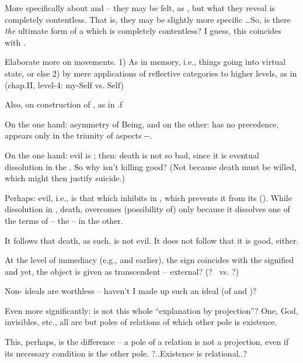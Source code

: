 \pa
More specifically about  and  -- they may 
be felt, as , but what they reveal is completely 
contentless. That is, they may be slightly more specific \ldots So, 
is there {\em the} ultimate form of a  which is completely 
contentless? I guess, this coincides with \sch. 

\pa
Elaborate more on  movements. 1) As in memory, i.e., 
things going into virtual state, or else 2) by mere applications of 
reflective categories to higher levels, as in 
 (chap.II, level-4: my-Self vs. Self)

Also, on construction of , as in .f


\pa
On the one hand: asymmetry of Being, and on the other:  has no precedence,
appears only in the triunity of aspects
--. 

On the one hand: evil is ; then: death is not so bad, since it is
eventual dissolution in the . So why isn't killing good? (Not
because death must be willed, which might then justify suicide.)

Perhaps: evil, i.e.,  is that which inhibits  in
, which prevents it from  its
 (). While dissolution in , death,
overcomes (possibility of)  only because it dissolves one of
the terms of  -- the  -- in the other.

It follows that death, as such, is not evil. It does not follow that it is good,
either. 

\pa
At the level of immediacy (e.g.,  and earlier), 
the sign coincides with the signified and yet, the object is given as 
transcendent -- external? (? \oss\ vs. \rss ?)

Non- ideals are worthless -- haven't I made up such an 
ideal (of  and )?

Even more significantly: is not this whole ``explanation by projection''? One,
God, invisibles, etc., all are but poles of relations of which other pole is
existence.

This, perhaps, is the difference -- a pole of a relation is not a
projection, even if its necessary condition is the other pole. ?..Existence is
relational..?

